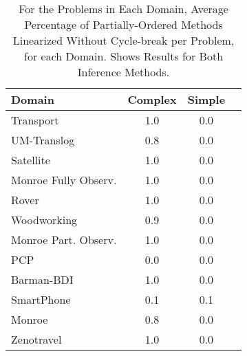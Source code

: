 \begin{table}
	\caption{For the Problems in Each Domain, Average Percentage of Partially-Ordered Methods Linearized Without Cycle-break per Problem, for each Domain. Shows Results for Both Inference Methods.}\label{table:POMethodBreak}
	\begin{tabular}{lccl}
		\toprule
		Domain & Complex & Simple &  \\
		\midrule
		Transport & 1.0 & 0.0  \\
		UM-Translog & 0.8 & 0.0  \\
		Satellite & 1.0 & 0.0  \\
		Monroe Fully Observ. & 1.0 & 0.0  \\
		Rover & 1.0 & 0.0  \\
		Woodworking & 0.9 & 0.0  \\
		Monroe Part. Observ. & 1.0 & 0.0  \\
		PCP & 0.0 & 0.0  \\
		Barman-BDI & 1.0 & 0.0  \\
		SmartPhone & 0.1 & 0.1  \\
		Monroe & 0.8 & 0.0  \\
		Zenotravel & 1.0 & 0.0  \\
		\bottomrule
	\end{tabular}
\end{table}
